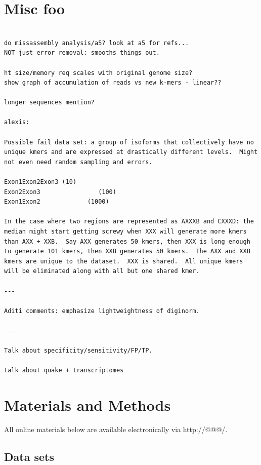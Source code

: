 \documentclass[10pt]{article}
\begin{document}
\section*{Misc foo}

\begin{verbatim}

do missassembly analysis/a5? look at a5 for refs...
NOT just error removal: smooths things out.

ht size/memory req scales with original genome size?
show graph of accumulation of reads vs new k-mers - linear??

longer sequences mention?

alexis:

Possible fail data set: a group of isoforms that collectively have no
unique kmers and are expressed at drastically different levels.  Might
not even need random sampling and errors.

Exon1Exon2Exon3 (10)
Exon2Exon3                (100)
Exon1Exon2             (1000)

In the case where two regions are represented as AXXXB and CXXXD: the
median might start getting screwy when XXX will generate more kmers
than AXX + XXB.  Say AXX generates 50 kmers, then XXX is long enough
to generate 101 kmers, then XXB generates 50 kmers.  The AXX and XXB
kmers are unique to the dataset.  XXX is shared.  All unique kmers
will be eliminated along with all but one shared kmer.

---

Aditi comments: emphasize lightweightness of diginorm.

---

Talk about specificity/sensitivity/FP/TP.

talk about quake + transcriptomes

\end{verbatim}

\section*{Materials and Methods}

All online materials below are available electronically via http://@@@/.

\subsection*{Data sets}
\end{document}
